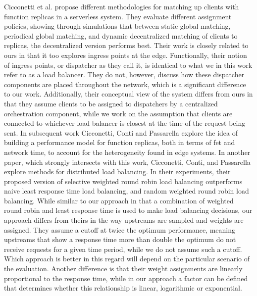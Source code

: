 Cicconetti et al. propose different methodologies for matching up clients with function replicas in a serverless system\cite{cicconettiDistributedComputingEnvironments2020}.
They evaluate different assignment policies, showing through simulations that between static global matching, periodical global matching, and dynamic decentralized matching of clients to replicas, the decentralized version performs best.
Their work is closely related to ours in that it too explores ingress points at the edge.
Functionally, their notion of ingress points, or dispatcher as they call it, is identical to what we in this work refer to as a load balancer.
They do not, however, discuss how these dispatcher components are placed throughout the network, which is a significant difference to our work.
Additionally, their conceptual view of the system differs from ours in that they assume clients to be assigned to dispatchers by a centralized orchestration component, while we work on the assumption that clients are connected to whichever load balancer is closest at the time of the request being sent.
In subsequent work Cicconetti, Conti and Passarella\cite{cicconettiArchitecturePerformanceEvaluation2020} explore the idea of building a performance model for function replicas, both in terms of \gls{fet} and network time, to account for the heterogeneity found in edge systems.
In another paper, which strongly intersects with this work, Cicconetti, Conti, and Passarella explore methods for distributed load balancing\cite{cicconettiDecentralizedFrameworkServerless2020}.
In their experiments, their proposed version of selective weighted round robin load balancing outperforms naive least response time load balancing, and random weighted round robin load balancing.
While similar to our approach in that a combination of weighted round robin and least response time is used to make load balancing decisions, our approach differs from theirs in the way upstreams are sampled and weights are assigned.
They assume a cutoff at twice the optimum performance, meaning upstreams that show a response time more than double the optimum do not receive requests for a given time period, while we do not assume such a cutoff\cite{cicconettiDecentralizedFrameworkServerless2020}.
Which approach is better in this regard will depend on the particular scenario of the evaluation.
Another difference is that their weight assignments are linearly proportional to the response time, while in our approach a factor can be defined that determines whether this relationship is linear, logarithmic or exponential.


